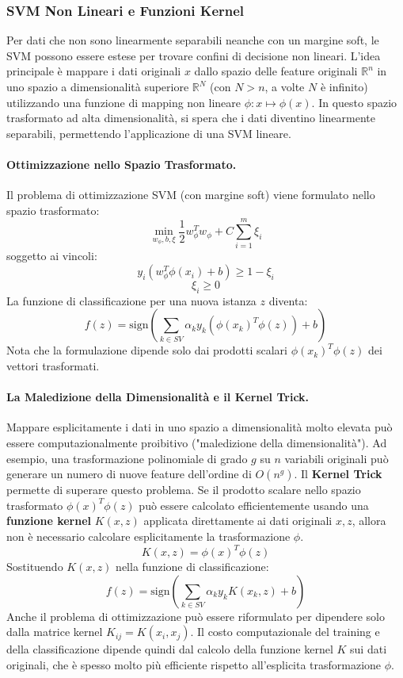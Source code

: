 \documentclass{article}
\begin{document}
\subsubsection{SVM Non Lineari e Funzioni Kernel}
Per dati che non sono linearmente separabili neanche con un margine soft, le SVM possono essere estese per trovare confini di decisione non lineari. L'idea principale è mappare i dati originali $x$ dallo spazio delle feature originali $\mathbb{R}^n$ in uno spazio a dimensionalità superiore $\mathbb{R}^N$ (con $N > n$, a volte $N$ è infinito) utilizzando una funzione di mapping non lineare $\phi: x \mapsto \phi(x)$. In questo spazio trasformato ad alta dimensionalità, si spera che i dati diventino linearmente separabili, permettendo l'applicazione di una SVM lineare.

\paragraph{Ottimizzazione nello Spazio Trasformato.}
Il problema di ottimizzazione SVM (con margine soft) viene formulato nello spazio trasformato:
$$ \min_{w_{\phi},b,\xi} \frac{1}{2} w_{\phi}^T w_{\phi} + C \sum_{i=1}^{m} \xi_i $$
soggetto ai vincoli:
$$ y_i (w_{\phi}^T \phi(x_i) + b) \ge 1 - \xi_i $$
$$ \xi_i \ge 0 $$
La funzione di classificazione per una nuova istanza $z$ diventa:
$$ f(z) = \text{sign} \left( \sum_{k \in SV} \alpha_k y_k (\phi(x_k)^T \phi(z)) + b \right) $$
Nota che la formulazione dipende solo dai prodotti scalari $\phi(x_k)^T \phi(z)$ dei vettori trasformati.

\paragraph{La Maledizione della Dimensionalità e il Kernel Trick.}
Mappare esplicitamente i dati in uno spazio a dimensionalità molto elevata può essere computazionalmente proibitivo ("maledizione della dimensionalità"). Ad esempio, una trasformazione polinomiale di grado $g$ su $n$ variabili originali può generare un numero di nuove feature dell'ordine di $O(n^g)$.
Il \textbf{Kernel Trick} permette di superare questo problema. Se il prodotto scalare nello spazio trasformato $\phi(x)^T \phi(z)$ può essere calcolato efficientemente usando una \textbf{funzione kernel} $K(x,z)$ applicata direttamente ai dati originali $x, z$, allora non è necessario calcolare esplicitamente la trasformazione $\phi$.
$$ K(x,z) = \phi(x)^T \phi(z) $$
Sostituendo $K(x,z)$ nella funzione di classificazione:
$$ f(z) = \text{sign} \left( \sum_{k \in SV} \alpha_k y_k K(x_k, z) + b \right) $$
Anche il problema di ottimizzazione può essere riformulato per dipendere solo dalla matrice kernel $K_{ij} = K(x_i, x_j)$. Il costo computazionale del training e della classificazione dipende quindi dal calcolo della funzione kernel $K$ sui dati originali, che è spesso molto più efficiente rispetto all'esplicita trasformazione $\phi$.
\end{document}
